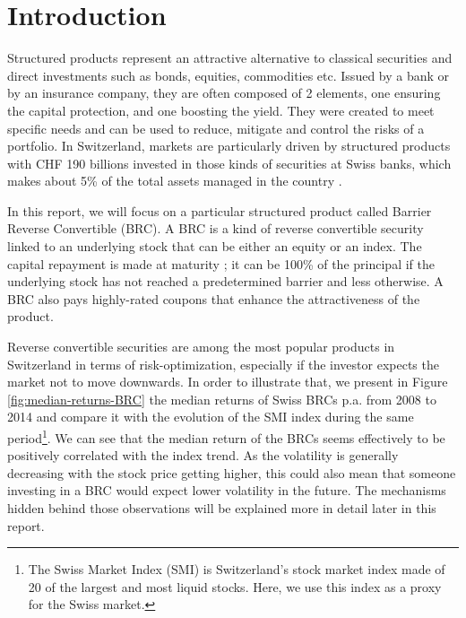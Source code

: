 \documentclass[a4paper,11pt,english]{book}
\begin{document}
\pagestyle{empty}
\tableofcontents
\listoffigures
\listoftables

\mainmatter
\chapter*{Introduction}
\vspace*{-2cm}

Structured products represent an attractive alternative to classical securities and direct investments such as bonds, equities, commodities etc. Issued by a bank or by an insurance company, they are often composed of 2 elements, one ensuring the capital protection, and one boosting the yield. They were created to meet specific needs and can be used to reduce, mitigate and control the risks of a portfolio. In Switzerland, markets are particularly driven by structured products with CHF 190 billions invested in those kinds of securities at Swiss banks, which makes about 5\% of the total assets managed in the country \cite{SSPA}.

In this report, we will focus on a particular structured product called Barrier Reverse Convertible (BRC). A BRC is a kind of reverse convertible security linked to an underlying stock that can be either an equity or an index. The capital repayment is made at maturity ; it can be 100\% of the principal if the underlying stock has not reached a predetermined barrier and less otherwise. A BRC also pays highly-rated coupons that enhance the attractiveness of the product.

Reverse convertible securities are among the most popular products in Switzerland in terms of risk-optimization, especially if the investor expects the market not to move downwards. In order to illustrate that, we present in Figure \ref{fig:median-returns-BRC} the median returns of Swiss BRCs p.a. from 2008 to 2014 \cite{SSPA-study} and compare it with the evolution of the SMI index during the same period\footnote{The Swiss Market Index (SMI) is Switzerland's stock market index made of 20 of the largest and most liquid stocks. Here, we use this index as a proxy for the Swiss market.}. We can see that the median return of the BRCs seems effectively to be positively correlated with the index trend. As the volatility is generally decreasing with the stock price getting higher, this could also mean that someone investing in a BRC would expect lower volatility in the future. The mechanisms hidden behind those observations will be explained more in detail later in this report.
\end{document}
